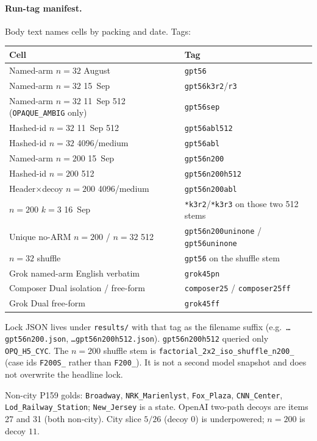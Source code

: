 \documentclass{article}
\begin{document}
\paragraph{Run-tag manifest.}
Body text names cells by packing and date. Tags:

{\small
\setlength{\tabcolsep}{4pt}
\begin{tabular}{@{}ll@{}}
\toprule
Cell & Tag \\
\midrule
Named-arm $n{=}32$ August & \texttt{gpt56} \\
Named-arm $n{=}32$ 15~Sep & \texttt{gpt56k3r2}/\texttt{r3} \\
Named-arm $n{=}32$ 11~Sep 512 (\texttt{OPAQUE\_AMBIG} only) & \texttt{gpt56sep} \\
Hashed-id $n{=}32$ 11~Sep 512 & \texttt{gpt56abl512} \\
Hashed-id $n{=}32$ 4096/medium & \texttt{gpt56abl} \\
Named-arm $n{=}200$ 15~Sep & \texttt{gpt56n200} \\
Hashed-id $n{=}200$ 512 & \texttt{gpt56n200h512} \\
Header$\times$decoy $n{=}200$ 4096/medium & \texttt{gpt56n200abl} \\
$n{=}200$ $k{=}3$ 16~Sep & \texttt{*k3r2}/\texttt{*k3r3} on those two 512 stems \\
Unique no-ARM $n{=}200$ / $n{=}32$ 512 & \texttt{gpt56n200uninone} / \texttt{gpt56uninone} \\
$n{=}32$ shuffle & \texttt{gpt56} on the shuffle stem \\
Grok named-arm English verbatim & \texttt{grok45pn} \\
Composer Dual isolation / free-form & \texttt{composer25} / \texttt{composer25ff} \\
Grok Dual free-form & \texttt{grok45ff} \\
\bottomrule
\end{tabular}
}

Lock JSON lives under \texttt{results/} with that tag as the filename suffix
(e.g.\ \texttt{\ldots gpt56n200.json}, \texttt{\ldots gpt56n200h512.json}).
\texttt{gpt56n200h512} queried only \texttt{OPQ\_H5\_CYC}.
The $n{=}200$ shuffle stem is
\texttt{factorial\_2x2\_iso\_shuffle\_n200\_}
(case ids \texttt{F200S\_} rather than \texttt{F200\_}).
It is not a second model snapshot and does not overwrite the headline lock.

Non-city P159 golds: \texttt{Broadway}, \texttt{NRK\_Marienlyst},
\texttt{Fox\_Plaza}, \texttt{CNN\_Center}, \texttt{Lod\_Railway\_Station};
\texttt{New\_Jersey} is a state.
OpenAI two-path decoys are items 27 and 31 (both non-city).
City slice $5/26$ (decoy $0$) is underpowered; $n{=}200$ is decoy $11$.
\end{document}
